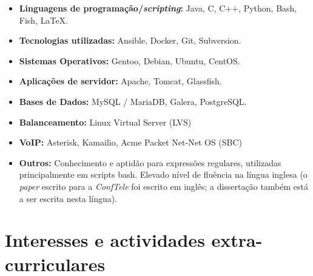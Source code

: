 \documentclass[11pt,a4paper,sans]{moderncv} %
\begin{document}
\begin{itemize}

\item \textbf{Linguagens de programação/\textit{scripting}:} Java, C, C++, Python, Bash, Fish, LaTeX. \\

\vspace{6pt}

\item \textbf{Tecnologias utilizadas:} Ansible, Docker, Git, Subversion.
  
\vspace{6pt}

\item \textbf{Sistemas Operativos:} Gentoo, Debian, Ubuntu, CentOS.

\vspace{6pt}

\item \textbf{Aplicações de servidor:} Apache, Tomcat, Glassfish.

\vspace{6pt}

\item \textbf{Bases de Dados:} MySQL / MariaDB, Galera, PostgreSQL.

\vspace{6pt}

\item \textbf{Balanceamento:} Linux Virtual Server (LVS)

\vspace{6pt}

\item \textbf{VoIP:} Asterisk, Kamailio, Acme Packet Net-Net OS (SBC)

\vspace{6pt}

\item \textbf{Outros: } Conhecimento e aptidão para expressões regulares,
  utilizadas principalmente em scripts bash. Elevado nível de fluência na língua
  inglesa (o \textit{paper} escrito para a \textit{ConfTele} foi escrito em
  inglês; a dissertação também está a ser escrita nesta língua).

\end{itemize}

\section{Interesses e actividades extra-curriculares}

\vspace{6pt}
\end{document}
